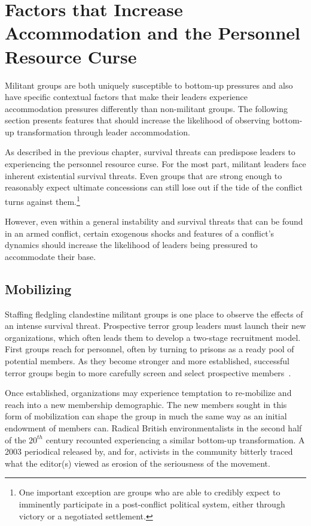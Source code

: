 \section{Factors that Increase Accommodation and the Personnel Resource Curse}

Militant groups are both uniquely susceptible to bottom-up pressures and also have specific contextual factors that make their leaders experience accommodation pressures differently than non-militant groups. The following section presents features that should increase the likelihood of observing bottom-up transformation through leader accommodation. 

As described in the previous chapter, survival threats can predispose leaders to experiencing the personnel resource curse. For the most part, militant leaders face inherent existential survival threats. Even groups that are strong enough to reasonably expect ultimate concessions can still lose out if the tide of the conflict turns against them.\footnote{One important exception are groups who are able to credibly expect to imminently participate in a post-conflict political system, either through victory or a negotiated settlement.}

However, even within a general instability and survival threats that can be found in an armed conflict, certain exogenous shocks and features of a conflict's dynamics should increase the likelihood of leaders being pressured to accommodate their base.

\subsection{Mobilizing}

Staffing fledgling clandestine militant groups is one place to observe the effects of an intense survival threat. Prospective terror group leaders must launch their new organizations, which often leads them to develop a two-stage recruitment model. First groups reach for personnel, often by turning to prisons as a ready pool of potential members. As they become stronger and more established, successful terror groups begin to more carefully screen and select prospective members~\autocite{bloom2017constructing}.

Once established, organizations may experience temptation to re-mobilize and reach into a new membership demographic. The new members sought in this form of mobilization can shape the group in much the same way as an initial endowment of members can.  Radical British environmentalists in the second half of the $20^{th}$ century recounted experiencing a similar bottom-up transformation. A 2003 periodical released by, and for, activists in the  community bitterly traced what the editor(s) viewed as erosion of the seriousness of the movement. 

